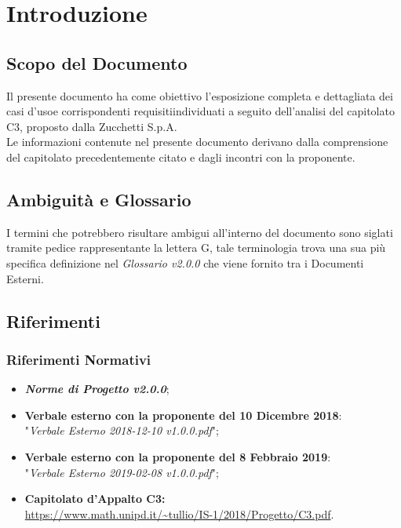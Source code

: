 \section{Introduzione}\label{Intro}

\subsection{Scopo del Documento}
Il presente documento ha come obiettivo l'esposizione completa e dettagliata dei casi d'uso\glossario e corrispondenti requisiti\glossario individuati a seguito dell'analisi del capitolato C3, proposto dalla Zucchetti S.p.A.\\
Le informazioni contenute nel presente documento derivano dalla comprensione del capitolato precedentemente citato e dagli incontri con la proponente.

\subsection{Ambiguità e Glossario}
I termini che potrebbero risultare ambigui all'interno del documento sono siglati tramite pedice rappresentante la lettera \textmd{G}, tale terminologia trova una sua più specifica definizione nel \textit{Glossario v2.0.0} che viene fornito tra i Documenti Esterni.

\subsection{Riferimenti}\label{Riferimenti}
\subsubsection{Riferimenti Normativi}
\label{RN}
\begin{itemize}
\item \textbf{\textit{Norme di Progetto v2.0.0}};
\item \textbf{Verbale esterno con la proponente del 10 Dicembre 2018}: \-\\ "\textit{Verbale Esterno 2018-12-10 v1.0.0.pdf}";
\item \textbf{Verbale esterno con la proponente del 8 Febbraio 2019}: \-\\ "\textit{Verbale Esterno 2019-02-08 v1.0.0.pdf}";
\item \textbf{Capitolato d'Appalto C3:}\\ \url{https://www.math.unipd.it/~tullio/IS-1/2018/Progetto/C3.pdf}.
\end{itemize}

